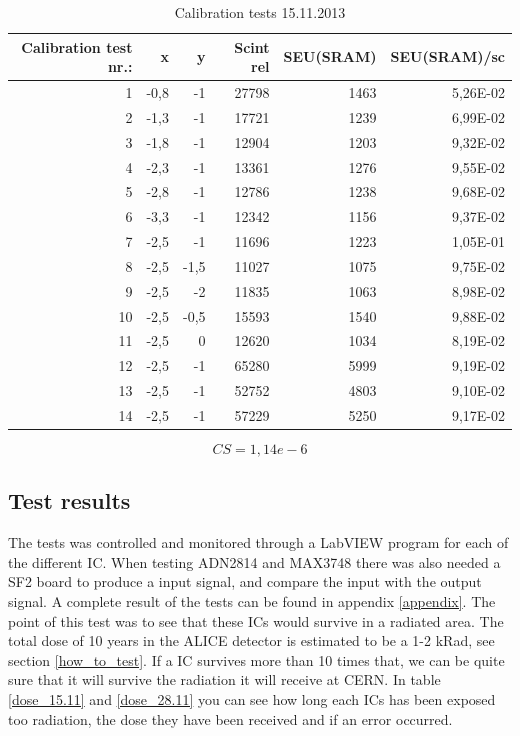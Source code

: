 \documentclass[12pt]{article}
\numberwithin{figure}{section}
\begin{document}
\begin{table}[!htbp]
  \centering
    \begin{tabular}{|r|r|r|r|r|r|}\hline
    Calibration test nr.: & x     & y     & Scint rel & SEU(\ac{SRAM}) & SEU(\ac{SRAM})/sc \\ \hline \hline
    1     & -0,8  & -1    & 27798 & 1463  & 5,26E-02 \\ \hline
    2     & -1,3  & -1    & 17721 & 1239  & 6,99E-02 \\ \hline
    3     & -1,8  & -1    & 12904 & 1203  & 9,32E-02 \\ \hline
    4     & -2,3  & -1    & 13361 & 1276  & 9,55E-02 \\ \hline
    5     & -2,8  & -1    & 12786 & 1238  & 9,68E-02 \\ \hline
    6     & -3,3  & -1    & 12342 & 1156  & 9,37E-02 \\ \hline
    7     & -2,5  & -1    & 11696 & 1223  & 1,05E-01 \\ \hline
    8     & -2,5  & -1,5  & 11027 & 1075  & 9,75E-02 \\ \hline
    9     & -2,5  & -2    & 11835 & 1063  & 8,98E-02 \\ \hline
    10    & -2,5  & -0,5  & 15593 & 1540  & 9,88E-02 \\ \hline
    11    & -2,5  & 0     & 12620 & 1034  & 8,19E-02 \\ \hline
    12    & -2,5  & -1    & 65280 & 5999  & 9,19E-02 \\ \hline
    13    & -2,5  & -1    & 52752 & 4803  & 9,10E-02 \\ \hline
    14    & -2,5  & -1    & 57229 & 5250  & 9,17E-02 \\ \hline
    \end{tabular}%
      \caption{Calibration tests 15.11.2013}
  \label{test_15.11}%
\end{table}%

\begin{equation}
CS = 1,14e-6
\label{CS}
\end{equation}

\subsection{Test results}
The tests was controlled and monitored through a LabVIEW program for each of the different IC. When testing ADN2814 and MAX3748 there was also needed a \ac{SF2} board to produce a input signal, and compare the input with the output signal. A complete result of the tests can be found in appendix \ref{appendix}.
The point of this test was to see that these ICs would survive in a radiated area. The total dose of 10 years in the ALICE detector is estimated to be a 1-2 kRad, see section \ref{how_to_test}. If a \ac{IC} survives more than 10 times that, we can be quite sure that it will survive the radiation it will receive at CERN.
In table \ref{dose_15.11} and \ref{dose_28.11} you can see how long each ICs has been exposed too radiation, the dose they have been received and if an error occurred.
\end{document}

